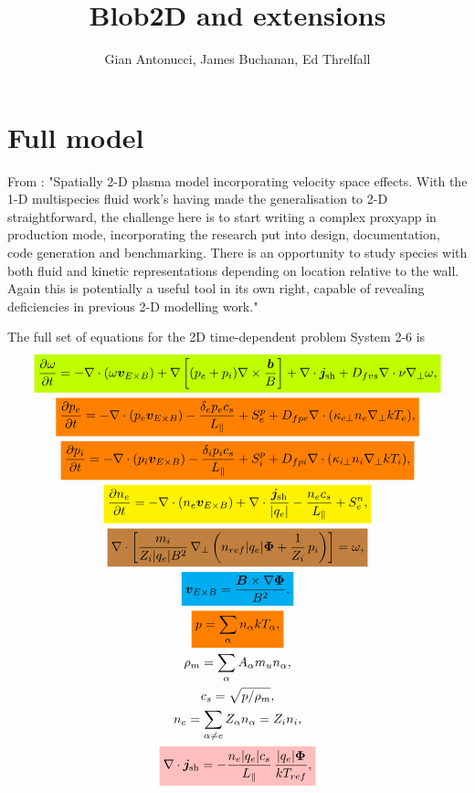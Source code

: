 \documentclass{article}
\title{Blob2D and extensions}
\author{Gian Antonucci, James Buchanan, Ed Threlfall}
\date{}
\newcommand{\mathcolorbox}[2]{\colorbox{#1}{$\displaystyle #2$}}
\begin{document}
\maketitle

\section{Full model}

From \cite{Arter_Equations_2023}: "Spatially 2-D plasma model incorporating velocity space effects. With the 1-D multispecies fluid work’s having made the generalisation to 2-D straightforward, the challenge here is to start writing a complex proxyapp in production mode, incorporating the research put into design, documentation, code generation and benchmarking. There is an opportunity to study species with both fluid and kinetic representations depending on location relative to the wall. Again this is potentially a useful tool in its own right, capable of revealing deficiencies in previous 2-D modelling work."

The full set of equations for the 2D time-dependent problem System 2-6 \cite[§8]{Arter_Equations_2023} is
%
\begin{gather}
    \mathcolorbox{lime}{ \frac{\partial\omega}{\partial t} = - \nabla \cdot (\omega \bm{v}_{E \times B}) + \nabla \left[ (p_e + p_i) \nabla \times \frac{\bm{b}}{B} \right] + \nabla \cdot \bm{j}_\text{sh} + D_{fvs} \nabla \cdot \nu \nabla_\perp \omega , } \\
    \mathcolorbox{orange}{ \frac{\partial p_e}{\partial t} = - \nabla \cdot (p_e \bm{v}_{E \times B}) - \frac{\delta_e p_e c_s}{L_\parallel} + S_e^p + D_{fpe} \nabla \cdot (\kappa_{e\perp} n_e \nabla_\perp kT_e) , } \\
    \mathcolorbox{orange}{ \frac{\partial p_i}{\partial t} = - \nabla \cdot (p_i \bm{v}_{E \times B}) - \frac{\delta_i p_i c_s}{L_\parallel} + S_i^p + D_{fpi} \nabla \cdot (\kappa_{i\perp} n_i \nabla_\perp kT_i) , } \\
    \mathcolorbox{yellow}{ \frac{\partial n_e}{\partial t} = - \nabla \cdot (n_e \bm{v}_{E \times B}) + \nabla \cdot \frac{\bm{j}_\text{sh}}{|q_e|} - \frac{n_e c_s}{L_\parallel} + S_e^n , } \\
    \mathcolorbox{brown}{ \nabla \cdot \left[ \frac{m_i}{Z_i |q_e| B^2} \, \nabla_\perp \left( n_{ref} |q_e| \bm{\Phi} + \frac{1}{Z_i} \, p_i \right) \right] = \omega , } \\
    \mathcolorbox{cyan}{ \bm{v}_{E \times B} = \frac{\bm{B} \times \nabla \bm{\Phi}}{B^2} . } \\
    \mathcolorbox{orange}{ p = \sum_\alpha n_\alpha kT_\alpha , } \\
    \rho_m = \sum_\alpha A_\alpha m_u n_\alpha , \\
    c_s = \sqrt{p / \rho_m} , \\
    n_e = \sum_{\alpha \ne e} Z_\alpha n_\alpha = Z_i n_i , \\
    \mathcolorbox{pink}{ \nabla \cdot \bm{j}_\text{sh} = - \frac{n_e |q_e| c_s}{L_\parallel} \, \frac{|q_e| \bm{\Phi}}{kT_{ref}} , } \\
\end{gather}
\end{document}
